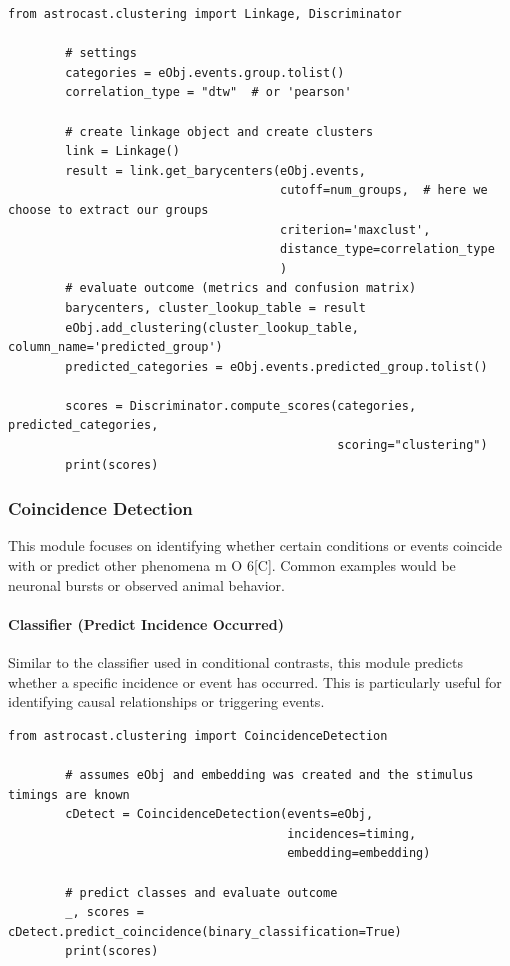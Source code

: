 \documentclass[utf8]{FrontiersinHarvard}
\newcommand{\fref}{ m O{} }{ (Figure~\ref{fig:#1}\IfValueT{#2}{\,#2})}
\begin{document}
    \begin{lstlisting}[style=pyStyle]
        from astrocast.clustering import Linkage, Discriminator

        # settings
        categories = eObj.events.group.tolist()
        correlation_type = "dtw"  # or 'pearson'

        # create linkage object and create clusters
        link = Linkage()
        result = link.get_barycenters(eObj.events,
                                      cutoff=num_groups,  # here we choose to extract our groups
                                      criterion='maxclust',
                                      distance_type=correlation_type
                                      )
        # evaluate outcome (metrics and confusion matrix)
        barycenters, cluster_lookup_table = result
        eObj.add_clustering(cluster_lookup_table, column_name='predicted_group')
        predicted_categories = eObj.events.predicted_group.tolist()

        scores = Discriminator.compute_scores(categories, predicted_categories,
                                              scoring="clustering")
        print(scores)
    \end{lstlisting}

    \subsubsection{Coincidence Detection}
    This module focuses on identifying whether certain conditions or events coincide with or predict other phenomena\fref{6}[C]. Common examples would be neuronal bursts or observed animal behavior.

    \paragraph{Classifier (Predict Incidence Occurred)}
    Similar to the classifier used in conditional contrasts, this module predicts whether a specific incidence or event has occurred. This is particularly useful for identifying causal relationships or triggering events.

    \begin{lstlisting}[style=pyStyle]
        from astrocast.clustering import CoincidenceDetection

        # assumes eObj and embedding was created and the stimulus timings are known
        cDetect = CoincidenceDetection(events=eObj,
                                       incidences=timing,
                                       embedding=embedding)

        # predict classes and evaluate outcome
        _, scores = cDetect.predict_coincidence(binary_classification=True)
        print(scores)
    \end{lstlisting}
\end{document}
